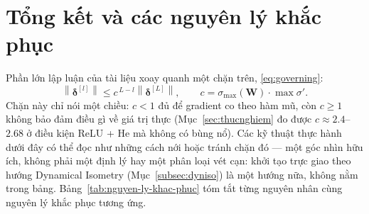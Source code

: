 \section{Tổng kết và các nguyên lý khắc phục}
\label{sec:tongket}

Phần lớn lập luận của tài liệu xoay quanh một chặn trên, \eqref{eq:governing}:
\[
  \left\|\boldsymbol{\delta}^{[l]}\right\| \le c^{\,L-l}\left\|\boldsymbol{\delta}^{[L]}\right\|,
  \qquad
  c = \sigma_{\max}(\mathbf{W}) \cdot \max\sigma' .
\]
Chặn này chỉ nói một chiều: $c<1$ đủ để gradient co theo hàm mũ, còn $c\ge1$
không bảo đảm điều gì về giá trị thực (Mục~\ref{sec:thucnghiem} đo được
$c\approx2.4$--$2.68$ ở điều kiện ReLU + He mà không có bùng nổ). Các kỹ thuật
thực hành dưới đây có thể đọc như những cách nới hoặc tránh chặn đó --- một góc
nhìn hữu ích, không phải một định lý hay một phân loại vét cạn: khởi tạo trực giao
theo hướng Dynamical Isometry (Mục~\ref{subsec:dyniso}) là một hướng nữa, không nằm
trong bảng. Bảng~\ref{tab:nguyen-ly-khac-phuc} tóm tắt từng nguyên nhân cùng nguyên lý
khắc phục tương ứng.

